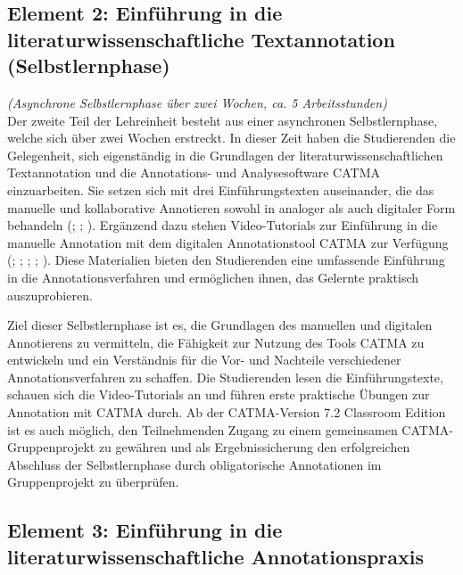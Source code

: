 \documentclass[
          a4paper,
        ]{article}
\begin{document}
\subsection{Element 2: Einführung in die literaturwissenschaftliche
Textannotation
(Selbstlernphase)}\label{element-2-einfuxfchrung-in-die-literaturwissenschaftliche-textannotation-selbstlernphase}

\emph{(Asynchrone Selbstlernphase über zwei Wochen, ca. 5
Arbeitsstunden)}\\
Der zweite Teil der Lehreinheit besteht aus einer asynchronen
Selbstlernphase, welche sich über zwei Wochen erstreckt. In dieser Zeit
haben die Studierenden die Gelegenheit, sich eigenständig in die
Grundlagen der literaturwissenschaftlichen Textannotation und die
Annotations- und Analysesoftware CATMA einzuarbeiten. Sie setzen sich
mit drei Einführungstexten auseinander, die das manuelle und
kollaborative Annotieren sowohl in analoger als auch digitaler Form
behandeln (; ;
). Ergänzend dazu stehen Video-Tutorials zur Einführung in die
manuelle Annotation mit dem digitalen Annotationstool CATMA zur
Verfügung (;
;
;
;
). Diese
Materialien bieten den Studierenden eine umfassende Einführung in die
Annotationsverfahren und ermöglichen ihnen, das Gelernte praktisch
auszuprobieren.

Ziel dieser Selbstlernphase ist es, die Grundlagen des manuellen und
digitalen Annotierens zu vermitteln, die Fähigkeit zur Nutzung des Tools
CATMA zu entwickeln und ein Verständnis für die Vor- und Nachteile
verschiedener Annotationsverfahren zu schaffen. Die Studierenden lesen
die Einführungstexte, schauen sich die Video-Tutorials an und führen
erste praktische Übungen zur Annotation mit CATMA durch. Ab der
CATMA-Version 7.2 Classroom Edition ist es auch möglich, den
Teilnehmenden Zugang zu einem gemeinsamen CATMA-Gruppenprojekt zu
gewähren und als Ergebnissicherung den erfolgreichen Abschluss der
Selbstlernphase durch obligatorische Annotationen im Gruppenprojekt zu
überprüfen.

\subsection{Element 3: Einführung in die literaturwissenschaftliche
Annotationspraxis}\label{element-3-einfuxfchrung-in-die-literaturwissenschaftliche-annotationspraxis}
\end{document}
